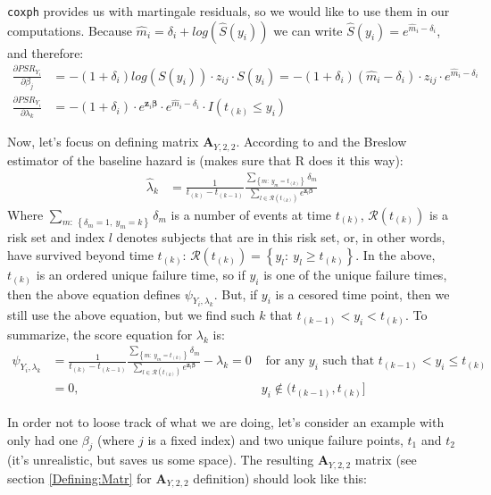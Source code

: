 \documentclass[]{article}
\begin{document}
\texttt{coxph} provides us with martingale residuals, so we would like to use them in our computations. Because $\hat{m}_i = \delta_i + log\left(\hat{S}(y_i) \right)$ we can write $\hat{S}(y_i) = e^{\hat{m}_i - \delta_i} $, and therefore: 
  $$
  \begin{aligned}
    \frac{\partial PSR_{Y_i}}{\partial \beta_j} &=  -(1+\delta_i)log\left(S(y_i)\right) \cdot  z_{ij}  \cdot  S(y_i)=  -(1+\delta_i)\left(\hat{m}_i - \delta_i \right) \cdot  z_{ij}  \cdot  e^{\hat{m}_i - \delta_i}\\
    \frac{\partial PSR_{Y_i}}{\partial \lambda_k} &= - (1+\delta_i)\cdot  e^{\pmb{z}_i\pmb{\beta}}   \cdot  e^{\hat{m}_i - \delta_i}\cdot I(t_{(k)}\leq y_i)
  \end{aligned}
  $$
  
Now, let's focus on defining matrix $\pmb{A}_{Y,2,2}$. According to \cite{breslow1972discussion} and \cite{lin2007breslow} the Breslow estimator of the baseline hazard is (makes sure that R does it this way): 
  $$
  \begin{aligned}
    \hat{\lambda}_k &= \frac{1}{t_{(k)} - t_{(k-1)}} \frac{\sum_{\left\{m:~y_m = t_{(k)}\right\}} \delta_m}{\sum_{l\in \mathcal{R}(t_{(k)})} e^{\pmb{z}_l\pmb{\beta}}}
  \end{aligned}
  $$
Where $\sum_{m:~ \left\{\delta_m=1,~ y_m = k\right\}} \delta_m$ is a number of events at time $t_{(k)}$, $\mathcal{R}(t_{(k)})$ is a risk set and index $l$ denotes subjects that are in this risk set, or, in other words, have survived beyond time $t_{(k)}$: $\mathcal{R}(t_{(k)}) = \left\{y_l: ~y_l \geq t_{(k)} \right\}$. In the above, $t_{(k)}$ is an ordered unique failure time, so if $y_i$ is one of the unique failure times, then the above equation defines $\psi_{Y_i,{\lambda}_k}$. But, if $y_i$ is a cesored time point, then we still use the above equation, but we find such $k$ that $t_{(k-1)} < y_i < t_{(k)}$. To summarize, the score equation for $\lambda_k$ is:
  $$
  \begin{aligned}
    \psi_{Y_i,{\lambda}_k} &= \frac{1}{t_{(k)} - t_{(k-1)}}  \frac{\sum_{\left\{m:~y_m = t_{(k)}\right\}} \delta_m}{\sum_{l\in \mathcal{R}(t_{(k)})} e^{\pmb{z}_l\pmb{\beta}}}- \lambda_k = 0  &\text{ for any } y_i \text{ such that } t_{(k-1)} < y_i \leq t_{(k)}\\
    &=0,~~ &y_i \notin (t_{(k-1)}, t_{(k)}]
  \end{aligned}
  $$

In order not to loose track of what we are doing, let's consider an example with only had one $\beta_j$ (where $j$ is a fixed index) and two unique failure points, $t_1$ and $t_2$ (it's unrealistic, but saves us some space). The resulting $\pmb{A}_{Y,2,2}$ matrix (see section \ref{Defining:Matr} for  $\pmb{A}_{Y,2,2}$ definition) should look like this: 
\end{document}
